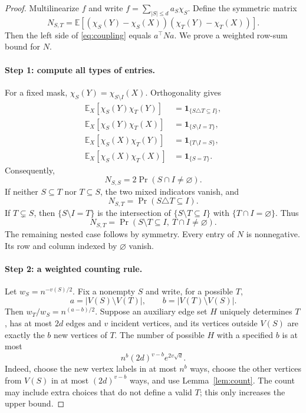 \documentclass[11pt]{article}
\newcommand{\E}{\mathbb E}
\newcommand{\1}{\mathbf 1}
\theoremstyle{definition}
\theoremstyle{remark}
\numberwithin{equation}{section}
\begin{document}
\begin{proof}
Multilinearize $f$ and write $f=\sum_{|S|\le d}a_S\chi_S$. Define the symmetric matrix
\[
 N_{S,T}=\E[(\chi_S(Y)-\chi_S(X))(\chi_T(Y)-\chi_T(X))].
\]
Then the left side of \eqref{eq:coupling} equals $a^\top Na$. We prove a weighted row-sum bound for $N$.

\paragraph{Step 1: compute all types of entries.}
For a fixed mask, $\chi_S(Y)=\chi_{S\setminus I}(X)$. Orthogonality gives
\begin{align*}
 \E_X[\chi_S(Y)\chi_T(Y)]&=\1_{\{S\triangle T\subseteq I\}},\\
 \E_X[\chi_S(Y)\chi_T(X)]&=\1_{\{S\setminus I=T\}},\\
 \E_X[\chi_S(X)\chi_T(Y)]&=\1_{\{T\setminus I=S\}},\\
 \E_X[\chi_S(X)\chi_T(X)]&=\1_{\{S=T\}}.
\end{align*}
Consequently,
\begin{equation}\label{eq:N-diag}
 N_{S,S}=2\Pr(S\cap I\ne\varnothing).
\end{equation}
If neither $S\subseteq T$ nor $T\subseteq S$, the two mixed indicators vanish, and
\begin{equation}\label{eq:N-inc}
 N_{S,T}=\Pr(S\triangle T\subseteq I).
\end{equation}
If $T\subsetneq S$, then $\{S\setminus I=T\}$ is the intersection of $\{S\setminus T\subseteq I\}$ with $\{T\cap I=\varnothing\}$. Thus
\begin{equation}\label{eq:N-nested}
 N_{S,T}=\Pr(S\setminus T\subseteq I,\ T\cap I\ne\varnothing).
\end{equation}
The remaining nested case follows by symmetry. Every entry of $N$ is nonnegative. Its row and column indexed by $\varnothing$ vanish.

\paragraph{Step 2: a weighted counting rule.}
Let $w_S=n^{-v(S)/2}$. Fix a nonempty $S$ and write, for a possible $T$,
\[
 a=|V(S)\setminus V(T)|,\qquad
 b=|V(T)\setminus V(S)|.
\]
Then $w_T/w_S=n^{(a-b)/2}$. Suppose an auxiliary edge set $H$ uniquely determines $T$, has at most $2d$ edges and $v$ incident vertices, and its vertices outside $V(S)$ are exactly the $b$ new vertices of $T$. The number of possible $H$ with a specified $b$ is at most
\begin{equation}\label{eq:label-count}
 n^b(2d)^{v-b}e^{2v\sqrt d}.
\end{equation}
Indeed, choose the new vertex labels in at most $n^b$ ways, choose the other vertices from $V(S)$ in at most $(2d)^{v-b}$ ways, and use Lemma~\ref{lem:count}. The count may include extra choices that do not define a valid $T$; this only increases the upper bound.


\end{proof}
\end{document}

